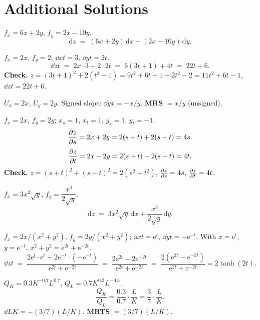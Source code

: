 \section{Additional Solutions}

\begin{solutions}
  \item $f_{x}=6x+2y$, $f_{y}=2x-10y$.
        \[
          \mathrm{d}z \;=\; (6x+2y)\,\mathrm{d}x+(2x-10y)\,\mathrm{d}y .
        \]

  \item $f_{x}=2x$, $f_{y}=2$; $\dd{x}{t}=3$, $\dd{y}{t}=2t$.
        \[
          \dd{z}{t} \;=\; 2x\cdot 3+2\cdot 2t \;=\; 6(3t+1)+4t
            \;=\; 22t+6 .
        \]
        \textbf{Check.} $z=(3t+1)^{2}+2(t^{2}-1)=9t^{2}+6t+1+2t^{2}-2
        =11t^{2}+6t-1$, $\dd{z}{t}=22t+6$. \checkmark

  \item $U_{x}=2x$, $U_{y}=2y$. Signed slope: $\dd{y}{x}=-x/y$.
        \textbf{MRS} $=x/y$ (unsigned).

  \item $f_{x}=2x$, $f_{y}=2y$; $x_{s}=1$, $x_{t}=1$, $y_{s}=1$,
        $y_{t}=-1$.
        \[
          \frac{\partial z}{\partial s}=2x+2y=2(s+t)+2(s-t)=4s .
        \]
        \[
          \frac{\partial z}{\partial t}=2x-2y=2(s+t)-2(s-t)=4t .
        \]
        \textbf{Check.} $z=(s+t)^{2}+(s-t)^{2}=2(s^{2}+t^{2})$,
        $\frac{\partial z}{\partial s}=4s$, $\frac{\partial z}{\partial t}=4t$. \checkmark

  \item $f_{x}=3x^{2}\sqrt{y}$, $f_{y}=\dfrac{x^{3}}{2\sqrt{y}}$.
        \[
          \mathrm{d}z \;=\; 3x^{2}\sqrt{y}\,\mathrm{d}x
            +\frac{x^{3}}{2\sqrt{y}}\,\mathrm{d}y .
        \]

  \item $f_{x}=2x/(x^{2}+y^{2})$, $f_{y}=2y/(x^{2}+y^{2})$;
        $\dd{x}{t}=\mathrm{e}^{t}$, $\dd{y}{t}=-\mathrm{e}^{-t}$. With
        $x=\mathrm{e}^{t}$, $y=\mathrm{e}^{-t}$,
        $x^{2}+y^{2}=\mathrm{e}^{2t}+\mathrm{e}^{-2t}$.
        \[
          \dd{z}{t} \;=\;
            \frac{2\mathrm{e}^{t}\cdot\mathrm{e}^{t}
              +2\mathrm{e}^{-t}\cdot(-\mathrm{e}^{-t})}
              {\mathrm{e}^{2t}+\mathrm{e}^{-2t}}
          \;=\; \frac{2\mathrm{e}^{2t}-2\mathrm{e}^{-2t}}
              {\mathrm{e}^{2t}+\mathrm{e}^{-2t}}
          \;=\; \frac{2(\mathrm{e}^{2t}-\mathrm{e}^{-2t})}
              {\mathrm{e}^{2t}+\mathrm{e}^{-2t}}
          =2\tanh(2t) .
        \]

  \item $Q_{K}=0.3K^{-0.7}L^{0.7}$, $Q_{L}=0.7K^{0.3}L^{-0.3}$.
        \[
          \frac{Q_{K}}{Q_{L}}=\frac{0.3}{0.7}\cdot\frac{L}{K}
            =\frac{3}{7}\cdot\frac{L}{K} .
        \]
        $\dd{L}{K}=-(3/7)(L/K)$. \textbf{MRTS} $=(3/7)(L/K)$.


\end{solutions}
